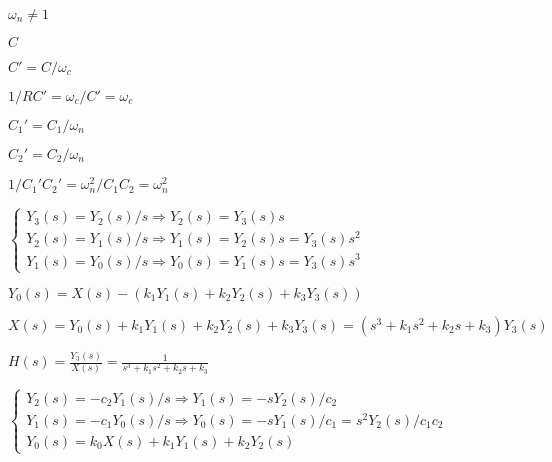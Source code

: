 \documentclass{article}
\def\lthtmlcheckvsize{\ifdim\ht\sizebox<\vsize 
  \ifdim\wd\sizebox<\hsize\expandafter\hfill\fi \expandafter\vfill
  \else\expandafter\vss\fi}%
\begin{document}
{\newpage\clearpage
{}%
$\omega_n\ne 1$%
\lthtmlindisplaymathZ
\lthtmlcheckvsize\clearpage}

{\newpage\clearpage
{}%
$C$%
\lthtmlindisplaymathZ
\lthtmlcheckvsize\clearpage}

{\newpage\clearpage
{}%
$C'=C/\omega_c$%
\lthtmlindisplaymathZ
\lthtmlcheckvsize\clearpage}

{\newpage\clearpage
{}%
$1/RC'=\omega_c/C'=\omega_c$%
\lthtmlindisplaymathZ
\lthtmlcheckvsize\clearpage}

{\newpage\clearpage
{}%
$C_1'=C_1/\omega_n$%
\lthtmlindisplaymathZ
\lthtmlcheckvsize\clearpage}

{\newpage\clearpage
{}%
$C_2'=C_2/\omega_n$%
\lthtmlindisplaymathZ
\lthtmlcheckvsize\clearpage}

{\newpage\clearpage
{}%
$1/C_1'C_2'=\omega_n^2/C_1C_2=\omega_n^2$%
\lthtmlindisplaymathZ
\lthtmlcheckvsize\clearpage}

{\newpage\clearpage
{}%
$\displaystyle \left\{ \begin{array}{l}
	Y_3(s)=Y_2(s)/s \Longrightarrow Y_2(s)=Y_3(s)s	\\
	Y_2(s)=Y_1(s)/s \Longrightarrow Y_1(s)=Y_2(s)s=Y_3(s)s^2	\\
	Y_1(s)=Y_0(s)/s \Longrightarrow Y_0(s)=Y_1(s)s=Y_3(s)s^3	
\end{array} \right.
$%
\lthtmlindisplaymathZ
\lthtmlcheckvsize\clearpage}

{\newpage\clearpage
{}%
$\displaystyle Y_0(s)=X(s)-(k_1Y_1(s)+k_2Y_2(s)+k_3Y_3(s))	$%
\lthtmlindisplaymathZ
\lthtmlcheckvsize\clearpage}

{\newpage\clearpage
{}%
$\displaystyle X(s)=Y_0(s)+k_1Y_1(s)+k_2Y_2(s)+k_3Y_3(s)=(s^3+k_1s^2+k_2s+k_3) Y_3(s)	$%
\lthtmlindisplaymathZ
\lthtmlcheckvsize\clearpage}

{\newpage\clearpage
{}%
$\displaystyle H(s)=\frac{Y_3(s)}{X(s)}=\frac{1}{s^3+k_1s^2+k_2s+k_3}
$%
\lthtmlindisplaymathZ
\lthtmlcheckvsize\clearpage}

{\newpage\clearpage
{}%
$\displaystyle \left\{ \begin{array}{ll}
	Y_2(s)=-c_2Y_1(s)/s  \Longrightarrow  Y_1(s)=-sY_2(s)/c_2 \\
	Y_1(s)=-c_1Y_0(s)/s  \Longrightarrow Y_0(s)=-sY_1(s)/c_1=s^2Y_2(s)/c_1c_2 \\
	Y_0(s)=k_0 X(s)+k_1Y_1(s)+k_2Y_2(s) 
	\end{array} \right.
$%
\lthtmlindisplaymathZ
\lthtmlcheckvsize\clearpage}
\end{document}
